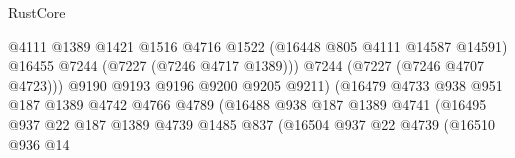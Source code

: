 \begin{lexlean}{RustCore}
\begin{coremodule}
                                                  @4111
                                                  @1389
                                                  @1421
                                                  @1516
                                                  @4716
                                                  @1522
                                                  (@16448 @805 @4111 @14587 @14591)
                                                  @16455
                                                  @7244
                                                  (@7227 (@7246 @4717 @1389)))
                                                @7244
                                                (@7227 (@7246 @4707 @4723)))
                                              @9190
                                              @9193
                                              @9196
                                              @9200
                                              @9205
                                              @9211)
                                            (@16479
                                              @4733
                                              @938
                                              @951
                                              @187
                                              @1389
                                              @4742
                                              @4766
                                              @4789
                                              (@16488
                                                @938
                                                @187
                                                @1389
                                                @4741
                                                (@16495
                                                  @937
                                                  @22
                                                  @187
                                                  @1389
                                                  @4739
                                                  @1485
                                                  @837
                                                  (@16504
                                                    @937
                                                    @22
                                                    @4739
                                                    (@16510
                                                      @936
                                                      @14

\end{coremodule}
\end{lexlean}
